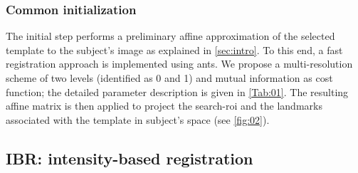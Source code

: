\documentclass{frontiers}
\begin{document}
\subsubsection{Common initialization}
\label{sec:meth_initialization}
The initial step performs a preliminary affine approximation of the selected
  template to the subject's image as explained in \autoref{sec:intro}.
To this end, a fast registration approach is implemented using \gls*{ants}.
We propose a multi-resolution scheme of two levels (identified as 0 and 1) and 
  mutual information as cost function; the detailed parameter description 
  is given in \autoref{Tab:01}.
The resulting affine matrix is then applied to project the search-\gls*{roi}
  and the landmarks associated with the template in
  subject's space (see \autoref{fig:02}).


\subsection{IBR: intensity-based registration}
\end{document}
